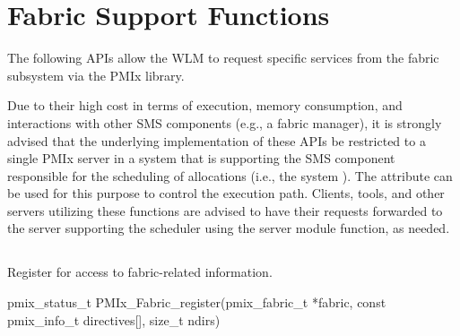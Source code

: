 


\section{Fabric Support Functions}

The following \acp{API} allow the \ac{WLM} to request specific services from the fabric subsystem via the \ac{PMIx} library.

\advicermstart
Due to their high cost in terms of execution, memory consumption, and interactions with other \ac{SMS} components (e.g., a fabric manager), it is strongly advised that the underlying implementation of these \acp{API} be restricted to a single \ac{PMIx} server in a system that is supporting the \ac{SMS} component responsible for the scheduling of allocations (i.e., the system ). The  attribute can be used for this purpose to control the execution path. Clients, tools, and other servers utilizing these functions are advised to have their requests forwarded to the server supporting the scheduler using the  server module function, as needed.
\advicermend

\subsection{}

\summary

Register for access to fabric-related information.

\format

\cspecificstart
\begin{codepar}
pmix_status_t
PMIx_Fabric_register(pmix_fabric_t *fabric,
                     const pmix_info_t directives[],
                     size_t ndirs)
\end{codepar}
\cspecificend

